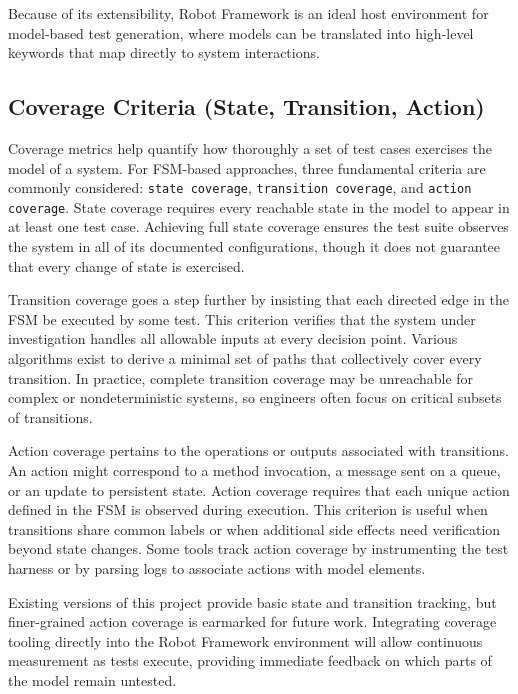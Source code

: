 Because of its extensibility, Robot Framework is an ideal host environment for model-based test
generation, where models can be translated into high-level keywords that map
directly to system interactions.

\subsection{Coverage Criteria (State, Transition, Action)}
Coverage metrics help quantify how thoroughly a set of test cases exercises the
model of a system. For FSM-based approaches, three fundamental criteria are
commonly considered: \texttt{state coverage}, \texttt{transition coverage}, and \texttt{action coverage}.
State coverage requires every reachable state in the model to appear in at least
one test case. Achieving full state coverage ensures the test suite observes the
system in all of its documented configurations, though it does not guarantee
that every change of state is exercised.

Transition coverage goes a step further by insisting that each directed edge in
the FSM be executed by some test. This criterion verifies that the system under
investigation handles all allowable inputs at every decision point. Various
algorithms exist to derive a minimal set of paths that collectively cover every
transition\cite{Binder1999}. In practice, complete transition coverage may be
unreachable for complex or nondeterministic systems, so engineers often focus on
critical subsets of transitions.

Action coverage pertains to the operations or outputs associated with
transitions. An action might correspond to a method invocation, a message sent
on a queue, or an update to persistent state. Action coverage requires that each
unique action defined in the FSM is observed during execution. This criterion is
useful when transitions share common labels or when additional side effects need
verification beyond state changes. Some tools track action coverage by instrumenting
the test harness or by parsing logs to associate actions with model elements.

Existing versions of this project provide basic state and transition tracking,
but finer-grained action coverage is earmarked for future work. Integrating
coverage tooling directly into the Robot Framework environment will allow
continuous measurement as tests execute, providing immediate feedback on which
parts of the model remain untested.

